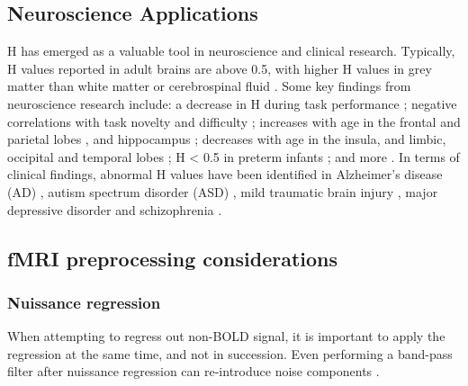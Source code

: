 \documentclass[
  sn-vancouver,
  Numbered,
  referee,
  lineno]{sn-jnl}
\begin{document}
\subsection{Neuroscience
Applications}\label{neuroscience-applications-1}

H has emerged as a valuable tool in neuroscience and clinical research.
Typically, H values reported in adult brains are above 0.5, with higher
H values in grey matter than white matter or cerebrospinal fluid
\citep{dongHurstExponentAnalysis2018, winkMonofractalMultifractalDynamics2008}.
Some key findings from neuroscience research include: a decrease in H
during task performance
\citep{ciuciuInterplayFunctionalConnectivity2014, heScaleFreePropertiesFunctional2011};
negative correlations with task novelty and difficulty
\citep{churchillSuppressionScalefreeFMRI2016}; increases with age in the
frontal and parietal lobes \citep{dongHurstExponentAnalysis2018}, and
hippocampus \citep{winkAgeCholinergicEffects2006}; decreases with age in
the insula, and limbic, occipital and temporal lobes
\citep{dongHurstExponentAnalysis2018}; H \textless{} 0.5 in preterm
infants \citep{mellaTemporalComplexityBOLDsignal2024}; and more
\citep{campbellMonofractalAnalysisFunctional2022}. In terms of clinical
findings, abnormal H values have been identified in Alzheimer's disease
(AD)
\citep{maximFractionalGaussianNoise2005, warsiCorrelatingBrainBlood2012},
autism spectrum disorder (ASD)
\citep{donaTemporalFractalAnalysis2017, laiShiftRandomnessBrain2010, linkeAlteredDevelopmentHurst2024, uscatescuUsingExcitationInhibition2022},
mild traumatic brain injury \citep{donaFractalAnalysisBrain2017}, major
depressive disorder
\citep{weiIdentifyingMajorDepressive2013, jingIdentifyingCurrentRemitted2017}
and schizophrenia
\citep{sokunbiNonlinearComplexityAnalysis2014, uscatescuUsingExcitationInhibition2022}.

\subsection{fMRI preprocessing
considerations}\label{fmri-preprocessing-considerations-1}

\subsubsection{Nuissance regression}\label{nuissance-regression-1}

When attempting to regress out non-BOLD signal, it is important to apply
the regression at the same time, and not in succession. Even performing
a band-pass filter after nuissance regression can re-introduce noise
components \citep{lindquistModularPreprocessingPipelines2019}.
\end{document}
